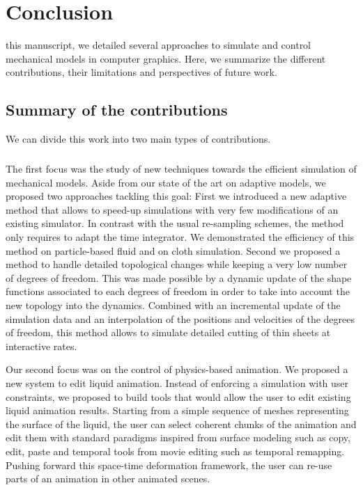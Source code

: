\chapter[Conclusion]{Conclusion}
\label{chap:conclusion}

 this manuscript, we detailed several approaches to simulate and control mechanical models in computer graphics. 
Here, we summarize the different contributions, their limitations and perspectives of future work.

\section{Summary of the contributions}
We can divide this work into two main types of contributions.
\paragraph*{}
The first focus was the study of new techniques towards the efficient simulation of mechanical models. 
Aside from our state of the art on adaptive models, we proposed two approaches tackling this goal: 
First we introduced a new adaptive method that allows to speed-up simulations with very few modifications of an existing simulator. 
In contrast with the usual re-sampling schemes, the method only requires to adapt the time integrator. 
We demonstrated the efficiency of this method on particle-based fluid and on cloth simulation.
Second we proposed a method to handle detailed topological changes while keeping a very low number of degrees of freedom. 
This was made possible by a dynamic update of the shape functions associated to each degrees of freedom in order to take into account the new topology into the dynamics. 
Combined with an incremental update of the simulation data and an interpolation of the positions and velocities of the degrees of freedom, this method allows to simulate detailed cutting of thin sheets at interactive rates.

Our second focus was on the control of physics-based animation. We proposed a new system to edit liquid animation. 
Instead of enforcing a simulation with user constraints, we proposed to build tools that would allow the user to edit existing liquid animation results. 
Starting from a simple sequence of meshes representing the surface of the liquid, the user can select coherent chunks of the animation and edit them with standard paradigms inspired from surface modeling such as copy, edit, paste and temporal tools from movie editing such as temporal remapping. 
Pushing forward this space-time deformation framework, the user can re-use parts of an animation in other animated scenes.

